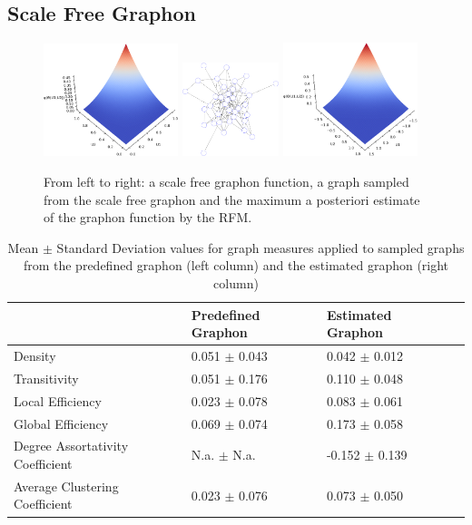 \documentclass[11pt]{report} %
\begin{document}
\subsection{Scale Free Graphon}
\begin{figure}[H]
    \center
    \includegraphics[width= 0.35\textwidth]{provengraphonscalefree}%
    \hfill
    \includegraphics[width= 0.25\textwidth]{scalefreegraph}%
    \hfill
    \includegraphics[width= 0.35\textwidth]{estimatedscalefreegraphon}%
    \caption{From left to right: a scale free graphon function, a graph sampled from the scale free graphon and the maximum a posteriori estimate of the graphon function by the RFM.}
    \label{estimatedscalefreegraphon}
\end{figure}
\begin{table}[h]
\caption{Mean $\pm$ Standard Deviation values for graph measures applied to sampled graphs from the predefined graphon (left column) and the estimated graphon (right column)}
\begin{tabular}{|l|l|l|l|}
\hline
 & \textbf{Predefined Graphon} & \textbf{Estimated Graphon}  \\ \hline
 Density & 0.051 $\pm$ 0.043 & 0.042 $\pm$ 0.012 \\ \hline
 Transitivity & 0.051 $\pm$ 0.176 & 0.110 $\pm$ 0.048 \\ \hline
Local Efficiency &  0.023 $\pm$ 0.078  & 0.083 $\pm$ 0.061 \\ \hline
Global Efficiency & 0.069 $\pm$ 0.074 & 0.173 $\pm$  0.058\\ \hline
Degree Assortativity Coefficient & N.a. $\pm$ N.a. &  -0.152 $\pm$ 0.139 \\ \hline
Average Clustering Coefficient & 0.023 $\pm$ 0.076 &  0.073 $\pm$ 0.050 \\ \hline
\end{tabular}
\end{table}
\end{document}
